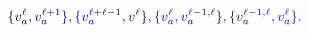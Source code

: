 \documentclass[12pt]{article}
\begin{document}
\makeatletter
\renewcommand*{\@textcolor}[3]{%
  \protect\leavevmode
  \begingroup
    \color#1{#2}#3%
  \endgroup
}
\makeatother
\begin{displaymath}
\mathcolor[RGB]{0,0,15}{\{} \mathcolor[RGB]{0,0,30}{v} _ { \mathcolor[RGB]{0,0,45}{a} } ^ { \mathcolor[RGB]{0,0,60}{\ell} } \mathcolor[RGB]{0,0,75}{,} \mathcolor[RGB]{0,0,90}{v} _ { \mathcolor[RGB]{0,0,105}{a} } ^ { \mathcolor[RGB]{0,0,120}{\ell} \mathcolor[RGB]{0,0,135}{+} \mathcolor[RGB]{0,0,150}{1} } \mathcolor[RGB]{0,0,165}{\}} \mathcolor[RGB]{0,0,180}{,} \mathcolor[RGB]{0,0,195}{\{} \mathcolor[RGB]{0,0,210}{v} _ { \mathcolor[RGB]{0,0,225}{a} } ^ { \mathcolor[RGB]{0,0,240}{\ell} \mathcolor[RGB]{0,0,255}{+} \mathcolor[RGB]{0,15,0}{\ell} \mathcolor[RGB]{0,15,15}{-} \mathcolor[RGB]{0,15,30}{1} } \mathcolor[RGB]{0,15,45}{,} \mathcolor[RGB]{0,15,60}{v} ^ { \mathcolor[RGB]{0,15,75}{\ell} } \mathcolor[RGB]{0,15,90}{\}} \mathcolor[RGB]{0,15,105}{,} \mathcolor[RGB]{0,15,120}{\{} \mathcolor[RGB]{0,15,135}{v} _ { \mathcolor[RGB]{0,15,150}{a} } ^ { \mathcolor[RGB]{0,15,165}{\ell} } \mathcolor[RGB]{0,15,180}{,} \mathcolor[RGB]{0,15,195}{v} _ { \mathcolor[RGB]{0,15,210}{a} } ^ { \mathcolor[RGB]{0,15,225}{\ell} \mathcolor[RGB]{0,15,240}{-} \mathcolor[RGB]{0,15,255}{1} \mathcolor[RGB]{0,30,0}{,} \mathcolor[RGB]{0,30,15}{\ell} } \mathcolor[RGB]{0,30,30}{\}} \mathcolor[RGB]{0,30,45}{,} \mathcolor[RGB]{0,30,60}{\{} \mathcolor[RGB]{0,30,75}{v} _ { \mathcolor[RGB]{0,30,90}{a} } ^ { \mathcolor[RGB]{0,30,105}{\ell} \mathcolor[RGB]{0,30,120}{-} \mathcolor[RGB]{0,30,135}{1} \mathcolor[RGB]{0,30,150}{,} \mathcolor[RGB]{0,30,165}{\ell} } \mathcolor[RGB]{0,30,180}{,} \mathcolor[RGB]{0,30,195}{v} _ { \mathcolor[RGB]{0,30,210}{a} } ^ { \mathcolor[RGB]{0,30,225}{\ell} } \mathcolor[RGB]{0,30,240}{\}} \mathcolor[RGB]{0,30,255}{.}
\end{displaymath}
\end{document}
